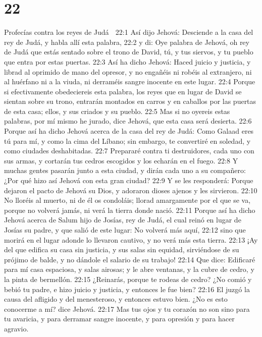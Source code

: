 \chapter{22}

Profecías contra los reyes de Judá  

22:1 Así dijo Jehová: Desciende a la casa del rey de Judá, y habla allí esta palabra,  
22:2 y di: Oye palabra de Jehová, oh rey de Judá que estás sentado sobre el trono de David, tú, y tus siervos, y tu pueblo que entra por estas puertas.  
22:3 Así ha dicho Jehová: Haced juicio y justicia, y librad al oprimido de mano del opresor, y no engañéis ni robéis al extranjero, ni al huérfano ni a la viuda, ni derraméis sangre inocente en este lugar.  
22:4 Porque si efectivamente obedeciereis esta palabra, los reyes que en lugar de David se sientan sobre su trono, entrarán montados en carros y en caballos por las puertas de esta casa; ellos, y sus criados y su pueblo.  
22:5 Mas si no oyereis estas palabras, por mí mismo he jurado, dice Jehová, que esta casa será desierta.  
22:6 Porque así ha dicho Jehová acerca de la casa del rey de Judá: Como Galaad eres tú para mí, y como la cima del Líbano; sin embargo, te convertiré en soledad, y como ciudades deshabitadas.  
22:7 Prepararé contra ti destruidores, cada uno con sus armas, y cortarán tus cedros escogidos y los echarán en el fuego.  
22:8 Y muchas gentes pasarán junto a esta ciudad, y dirán cada uno a su compañero: ¿Por qué hizo así Jehová con esta gran ciudad?  
22:9 Y se les responderá: Porque dejaron el pacto de Jehová su Dios, y adoraron dioses ajenos y les sirvieron.  
22:10 No lloréis al muerto, ni de él os condoláis; llorad amargamente por el que se va, porque no volverá jamás, ni verá la tierra donde nació.  
22:11 Porque así ha dicho Jehová acerca de Salum hijo de Josías, rey de Judá, el cual reinó en lugar de Josías su padre, y que salió de este lugar: No volverá más aquí,  
22:12 sino que morirá en el lugar adonde lo llevaron cautivo, y no verá más esta tierra.  
22:13 ¡Ay del que edifica su casa sin justicia, y sus salas sin equidad, sirviéndose de su prójimo de balde, y no dándole el salario de su trabajo!  
22:14 Que dice: Edificaré para mí casa espaciosa, y salas airosas; y le abre ventanas, y la cubre de cedro, y la pinta de bermellón. 
22:15 ¿Reinarás, porque te rodeas de cedro? ¿No comió y bebió tu padre, e hizo juicio y justicia, y entonces le fue bien?  
22:16 El juzgó la causa del afligido y del menesteroso, y entonces estuvo bien. ¿No es esto conocerme a mí? dice Jehová.  
22:17 Mas tus ojos y tu corazón no son sino para tu avaricia, y para derramar sangre inocente, y para opresión y para hacer agravio.  
